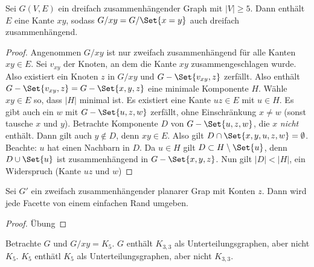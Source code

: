 \begin{st}[Thomassen, 1980]
    Sei $G(V, E)$ ein dreifach zusammenhängender Graph mit $|V| \ge 5$.
    Dann enthält $E$ eine Kante $xy$, sodass $G / xy = G / \Set{x=y}$ auch dreifach zusammenhängend.
    \begin{proof}
        Angenommen $G / xy$ ist nur zweifach zusammenhängend für alle Kanten $xy \in E$.
        Sei $v_{xy}$ der Knoten, an dem die Kante $xy$ zusammengeschlagen wurde.
        Also existiert ein Knoten $z$ in $G / xy$ und $G - \Set{v_{xy}, z}$ zerfällt.
        Also enthält $G - \Set{v_{xy}, z} = G - \Set{x,y,z}$ eine minimale Komponente $H$.
        Wähle $xy \in E$ so, dass $|H|$ minimal ist.
        Es existiert eine Kante $uz \in E$ mit $u \in H$.
        Es gibt auch ein $w$ mit $G - \Set{u,z,w}$ zerfällt, ohne Einschränkung $x \neq w$ (sonst tausche $x$ und $y$).
        Betrachte Komponente $D$ von $G - \Set{u,z,w}$, die $x$ \emph{nicht} enthält.
        Dann gilt auch $y \not\in D$, denn $xy \in E$.
        Also gilt $D \cap \Set{x,y,u,z,w} = \emptyset$.
        Beachte: $u$ hat einen Nachbarn in $D$.
        Da $u \in H$ gilt $D \subset H \setminus \Set{u}$, denn $D \cup \Set{u}$ ist zusammenhängend in $G - \Set{x,y,z}$.
        Nun gilt $|D| < |H|$, ein Widerspruch (Kante $uz$ und $w$)
    \end{proof}
\end{st}

\begin{lem}
    Sei $G'$ ein zweifach zusammenhängender planarer Grap mit Konten $z$.
    Dann wird jede Facette von einem einfachen Rand umgeben.
    \begin{proof}
        Übung
    \end{proof}
\end{lem}

\begin{ex}
    Betrachte $G$ und $G / xy = K_5$.
    $G$ enthält $K_{3,3}$ als Unterteilungsgraphen, aber nicht $K_5$.
    $K_5$ enthätl $K_5$ als Unterteilungsgraphen, aber nicht $K_{3,3}$.
\end{ex}
